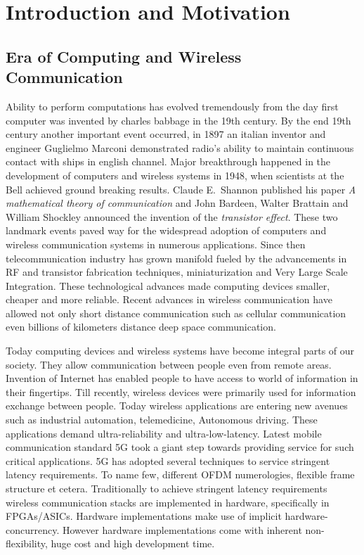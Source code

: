 \chapter{Introduction and Motivation} \label{chap:introduction}

\section{Era of Computing and Wireless Communication}
Ability to perform computations has evolved tremendously from the day first computer was invented by charles babbage in the 19th century. By the end 19th century another important event occurred, in 1897 an italian inventor and engineer Guglielmo Marconi demonstrated radio's ability to maintain continuous contact with ships in english channel. Major breakthrough happened in the development of computers and wireless systems in 1948, when scientists at the Bell achieved ground breaking results. Claude E.~Shannon published his paper \emph{A mathematical theory of communication} and John Bardeen, Walter Brattain and William Shockley announced the invention of the \emph{transistor effect}. These two landmark events paved way for the widespread adoption of computers and wireless communication systems in numerous applications. Since then telecommunication industry has grown manifold fueled by the advancements in RF and transistor fabrication techniques, miniaturization and Very Large Scale Integration. These technological advances made computing devices smaller, cheaper and more reliable. Recent advances in wireless communication have allowed not only short distance communication such as cellular communication even billions of kilometers distance deep space communication. \newline


Today computing devices and wireless systems have become integral parts of our society. They allow communication between people even from remote areas. Invention of Internet has enabled people to have access to world of information in their fingertips. Till recently, wireless devices were primarily used for information exchange between people. Today wireless applications are entering new avenues such as industrial automation, telemedicine, Autonomous driving. These applications demand ultra-reliability and ultra-low-latency. Latest mobile communication standard 5G took a giant step towards providing service for such critical applications. 5G has adopted several techniques to service stringent latency requirements. To name few, different OFDM numerologies, flexible frame structure et cetera. Traditionally to achieve stringent latency requirements wireless communication stacks are implemented in hardware, specifically in FPGAs/ASICs. Hardware implementations make use of implicit hardware-concurrency. However hardware implementations come with inherent non-flexibility, huge cost and high development time.

